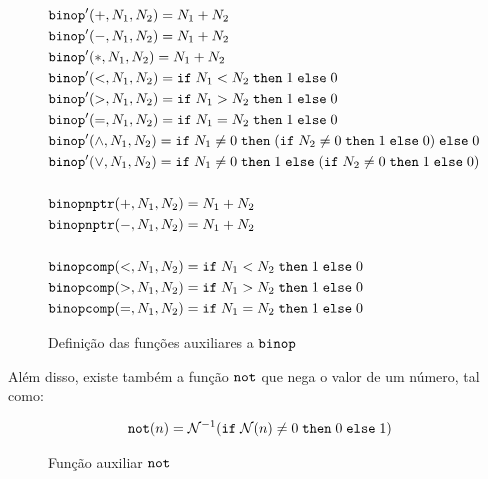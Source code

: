 \begin{figure}[ht]
	\begin{align}
		& \texttt{binop}'(+, N_1, N_2) = N_1 + N_2 \label{fig:def:binop1}\\
		& \texttt{binop}'(-, N_1, N_2) = N_1 + N_2\\
		& \texttt{binop}'(*, N_1, N_2) = N_1 + N_2\\
		& \texttt{binop}'(<, N_1, N_2) = \texttt{if}\; N_1 < N_2 \;\texttt{then}\; 1 \;\texttt{else} \;0\\
		& \texttt{binop}'(>, N_1, N_2) = \texttt{if}\; N_1 > N_2 \;\texttt{then}\; 1 \;\texttt{else} \;0\\
		& \texttt{binop}'(=, N_1, N_2) = \texttt{if}\; N_1 = N_2 \;\texttt{then}\; 1 \;\texttt{else} \;0\\
		& \texttt{binop}'(\land, N_1, N_2) = \texttt{if}\; N_1 \neq 0 \;\texttt{then}\; (\texttt{if}\; N_2 \neq 0 \;\texttt{then}\; 1 \;\texttt{else} \;0) \;\texttt{else} \;0\\
		& \texttt{binop}'(\lor, N_1, N_2) = \texttt{if}\; N_1 \neq 0 \;\texttt{then}\; 1 \;\texttt{else} \;(\texttt{if}\; N_2 \neq 0 \;\texttt{then}\; 1 \;\texttt{else} \;0) \label{fig:def:binop2}\\
		\nonumber \\
		& \texttt{binopnptr}(+, N_1, N_2) = N_1 + N_2  \label{fig:def:binop3}\\
		& \texttt{binopnptr}(-, N_1, N_2) = N_1 + N_2  \label{fig:def:binop4}\\
		\nonumber \\
		& \texttt{binopcomp}(<, N_1, N_2) = \texttt{if}\; N_1 < N_2 \;\texttt{then}\; 1 \;\texttt{else} \;0  \label{fig:def:binop5}\\
		& \texttt{binopcomp}(>, N_1, N_2) = \texttt{if}\; N_1 > N_2 \;\texttt{then}\; 1 \;\texttt{else} \;0  \label{fig:def:binop6}\\
		& \texttt{binopcomp}(=, N_1, N_2) = \texttt{if}\; N_1 = N_2 \;\texttt{then}\; 1 \;\texttt{else} \;0  \label{fig:def:binop7}
	\end{align}
	\caption{Definição das funções auxiliares a $\texttt{binop}$}
	\label{fig:def:binop:extra}
\end{figure}
\FloatBarrier

Além disso, existe também a função $\texttt{not}$ que nega o valor de um número, tal como: 
\begin{figure}[ht]
	\begin{align}
		\texttt{not}(n) = \mathcal{N}^{-1}(\texttt{if}\; \mathcal{N}(n) \neq 0 \;\texttt{then}\; 0 \;\texttt{else} \;1)
	\end{align}
	\caption{Função auxiliar $\texttt{not}$}
	\label{fig:def:not}
\end{figure}
\FloatBarrier

